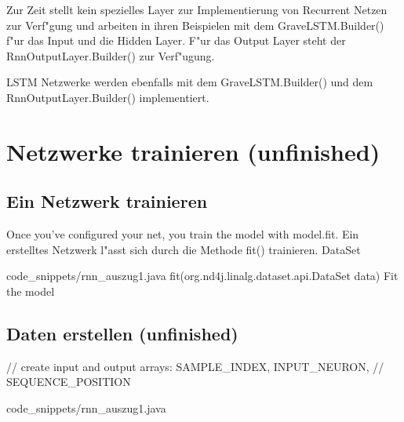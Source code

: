 {Zur Zeit stellt \cite{DL4J} kein spezielles Layer zur Implementierung von Recurrent Netzen zur Verf"gung und arbeiten in ihren Beispielen mit dem GraveLSTM.Builder() f"ur das Input und die Hidden Layer. F"ur das Output Layer steht der RnnOutputLayer.Builder() zur Verf"ugung.

LSTM Netzwerke werden ebenfalls mit dem GraveLSTM.Builder() und dem RnnOutputLayer.Builder() implementiert.


\section{Netzwerke trainieren (unfinished)}
\subsection{Ein Netzwerk trainieren}
Once you’ve configured your net, you train the model with model.fit.
Ein erstelltes Netzwerk l"asst sich durch die Methode fit() trainieren. DataSet

{code_snippets/rnn_auszug1.java}
fit(org.nd4j.linalg.dataset.api.DataSet data)
Fit the model

\subsection{Daten erstellen (unfinished)}
// create input and output arrays: SAMPLE\_INDEX, INPUT\_NEURON,
    // SEQUENCE\_POSITION

{code_snippets/rnn_auszug1.java}


} %